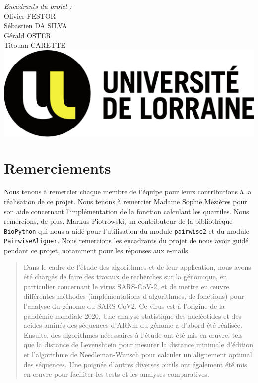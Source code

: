 \documentclass[12pt]{article}
\begin{document}
\begin{titlepage}
	\large
	\emph{Encadrants du projet :}\\
	   Olivier FESTOR\\
	   Sébastien DA SILVA\\
	   Gérald OSTER\\
	   Titouan CARETTE\\[1.5 cm]

	\includegraphics[scale=0.15]{logo_UL_horizontal}\\[1.5 cm]

	\vfill
\end{titlepage}

\section*{Remerciements}
Nous tenons à remercier chaque membre de l'équipe pour leurs contributions à la réalisation de ce projet. Nous tenons à remercier Madame Sophie Mézières pour son aide concernant l'implémentation de la fonction calculant les quartiles. Nous remercions, de plus, Markus Piotrowski, un contributeur de la bibliothèque \texttt{BioPython} qui nous a aidé pour l'utilisation du module \texttt{pairwise2} et du module \texttt{PairwiseAligner}. Nous remercions les encadrants du projet de nous avoir guidé pendant ce projet, notamment pour les réponses aux e-mails.\\[2.5 cm]

\begin{abstract}
    Dans le cadre de l'étude des algorithmes et de leur application, nous avons été chargés de faire des travaux de recherches sur la génomique, en particulier concernant le virus SARS-CoV-2, et de mettre en œuvre différentes méthodes (implémentations d'algorithmes, de fonctions) pour l'analyse du génome du SARS-CoV2. Ce virus est à l'origine de la pandémie mondiale 2020. Une analyse statistique des nucléotides et des acides aminés des séquences d'ARNm du génome a d'abord été réalisée. Ensuite, des algorithmes nécessaires à l'étude ont été mis en œuvre, tels que la distance de Levenshtein pour mesurer la distance minimale d'édition et l'algorithme de Needleman-Wunsch pour calculer un alignement optimal des séquences. Une poignée d'autres diverses outils ont également été mis en œuvre pour faciliter les tests et les analyses comparatives.
\end{abstract}
\end{document}
